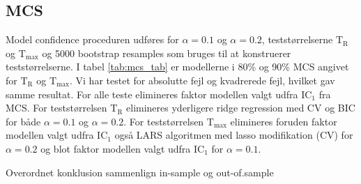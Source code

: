 \subsection{MCS} 
Model confidence proceduren udføres for \(\alpha = 0.1\) og \(\alpha = 0.2\), teststørrelserne \(\text{T}_\text{R}\) og \(\text{T}_\text{max}\) og 5000 bootstrap resamples som bruges til at konstruerer teststørrelserne.
I tabel \ref{tab:mcs_tab} er modellerne i 80\% og 90\% MCS angivet for \(\text{T}_\text{R}\) og \(\text{T}_\text{max}\).
Vi har testet for absolutte fejl og kvadrerede fejl, hvilket gav samme resultat.
For alle teste elimineres faktor modellen valgt udfra IC\(_1\) fra MCS.
For teststørrelsen \(\text{T}_\text{R}\) elimineres yderligere ridge regression med CV og BIC for både \(\alpha = 0.1\) og \(\alpha = 0.2\).
For teststørrelsen \(\text{T}_\text{max}\) elimineres foruden faktor modellen valgt udfra IC\(_1\) også LARS algoritmen med lasso modifikation (CV) for \(\alpha = 0.2\) og blot faktor modellen valgt udfra IC\(_1\) for \(\alpha = 0.1\).
%

%
Overordnet konklusion
sammenlign in-sample og out-of.sample